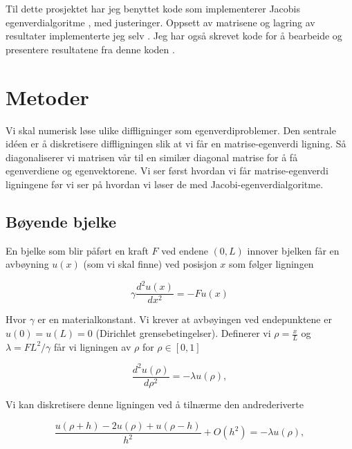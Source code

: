 \documentclass[reprint,english,notitlepage]{revtex4-1}
\begin{document}
	Til dette prosjektet har jeg benyttet kode som implementerer Jacobis egenverdialgoritme \cite{eigvalEmne}, med justeringer. Oppsett av matrisene og lagring av resultater implementerte jeg selv \cite{myRepo}. Jeg har også skrevet kode for å bearbeide og presentere resultatene fra denne koden \cite{myRepo}.

\section{Metoder} %
	Vi skal numerisk løse ulike diffligninger som egenverdiproblemer. Den sentrale idéen er å diskretisere diffligningen slik at vi får en matrise-egenverdi ligning. Så diagonaliserer vi matrisen vår til en similær diagonal matrise for å få egenverdiene og egenvektorene. Vi ser først hvordan vi får matrise-egenverdi ligningene før vi ser på hvordan vi løser de med Jacobi-egenverdialgoritme.
	
\subsection{Bøyende bjelke}
	
	En bjelke som blir påført en kraft $F$ ved endene $(0, L)$ innover bjelken får en avbøyning $u(x)$ (som vi skal finne) ved posisjon $x$ som følger ligningen
	
	\begin{equation*}
	\gamma \frac{d^2 u(x)}{dx^2} = -F u(x)
	\end{equation*}
	
	Hvor $\gamma$ er en materialkonstant. Vi krever at avbøyingen ved endepunktene er $u(0) = u(L) = 0$ (Dirichlet grensebetingelser). Definerer vi $\rho = \frac{x}{L}$ og $\lambda = FL^2/\gamma$ får vi ligningen av $\rho$ for $\rho \in [0,1]$
	
	\begin{equation*}
	\frac{d^2 u(\rho)}{d\rho^2} = -\lambda u(\rho),
	\end{equation*}
	
	Vi kan diskretisere denne ligningen ved å tilnærme den andrederiverte
	
	\begin{equation*}
	\frac{u(\rho+h) -2u(\rho) +u(\rho-h)}{h^2} + O(h^2) = -\lambda u(\rho),
	\end{equation*}
	
\end{document}
